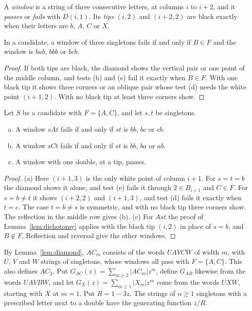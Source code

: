 A \emph{window} is a string of three consecutive letters, at columns $i$ to $i+2$, and it
\emph{passes} or \emph{fails} with $D(i,1)$. Its \emph{tips} $(i,2)$ and $(i+2,2)$ are black
exactly when their letters are $b$, $A$, $C$ or $X$.

\begin{lemma}\label{lem:dichotomy}
In a candidate, a window of three singletons fails if and only if $B\in F$ and the window is
$bab$, $bbb$ or $bcb$.
\end{lemma}

\begin{proof}
If both tips are black, the diamond shows the vertical pair or one point of the middle column,
and tests (b) and (e) fail it exactly when $B\in F$. With one black tip it shows three corners or
an oblique pair whose test (d) needs the white point $(i+1,2)$. With no black tip at least three
corners show.
\end{proof}

\begin{lemma}\label{lem:sixofnine}
Let $S$ be a candidate with $F=\{A,C\}$, and let $s,t$ be singletons.
\begin{enumerate}[(a)]
\item A window $sAt$ fails if and only if $st$ is $bb$, $bc$ or $cb$.
\item A window $sCt$ fails if and only if $st$ is $bb$, $ba$ or $ab$.
\item A window with one double, at a tip, passes.
\end{enumerate}
\end{lemma}

\begin{proof}
(a) Here $(i+1,3)$ is the only white point of column $i+1$. For $s=t=b$ the diamond shows it
alone, and test (e) fails it through $2\in B_{i+1}$ and $C\in F$. For $s=b\ne t$ it shows
$(i+2,2)$ and $(i+1,3)$, and test (d) fails it exactly when $t=c$. The case $t=b\ne s$ is
symmetric, and with no black tip three corners show. The reflection in the middle row gives (b).
(c) For $Ast$ the proof of Lemma~\ref{lem:dichotomy} applies with the black tip $(i,2)$ in place
of $s=b$, and $B\notin F$. Reflection and reversal give the other windows.
\end{proof}

By Lemma~\ref{lem:diamond}, $AC_m$ consists of the words $UAVCW$ of width $m$, with $U$, $V$ and
$W$ strings of singletons, whose windows all pass with $F=\{A,C\}$. This also defines $AC_2$.
Put $G_{AC}(z)=\sum_{m\ge2}|AC_m|z^m$, define $G_{AB}$ likewise from the words $UAVBW$, and let
$G_X(z)=\sum_{m\ge1}|X_m|z^m$ come from the words $UXW$, starting with $X$ at $m=1$. Put
$R=1-3z$. The strings of $n\ge1$ singletons with a prescribed letter next to a double have the
generating function $z/R$.


